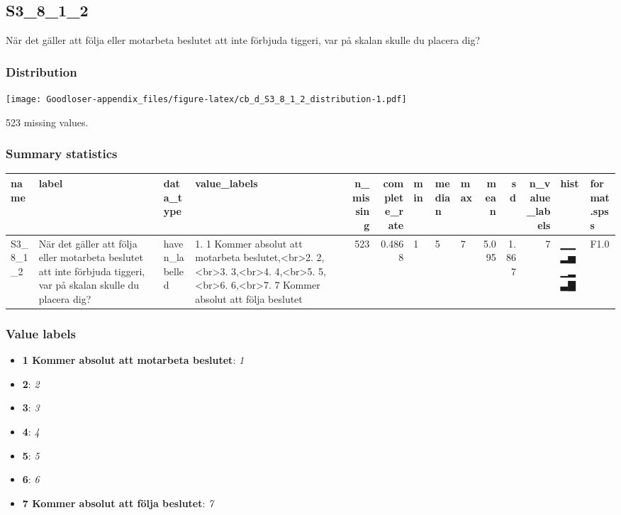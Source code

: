 \documentclass[
]{book}
\providecommand{\tightlist}{%
  \setlength{\itemsep}{0pt}\setlength{\parskip}{0pt}}
\begin{document}
\hypertarget{S3_8_1_2}{%
\subsection{S3\_8\_1\_2}\label{S3_8_1_2}}

När det gäller att följa eller motarbeta beslutet att inte förbjuda tiggeri, var på skalan skulle du placera dig?

\hypertarget{S3_8_1_2_distribution}{%
\subsubsection{Distribution}\label{S3_8_1_2_distribution}}

\texttt{[image: Goodloser-appendix\_files/figure-latex/cb\_d\_S3\_8\_1\_2\_distribution-1.pdf]}

523 missing values.

\hypertarget{S3_8_1_2_summary}{%
\subsubsection{Summary statistics}\label{S3_8_1_2_summary}}

\begin{tabular}{l|l|l|l|r|r|l|l|l|r|r|r|l|l}
\hline
name & label & data_type & value_labels & n_missing & complete_rate & min & median & max & mean & sd & n_value_labels & hist & format.spss\\
\hline
S3_8_1_2 & När det gäller att följa eller motarbeta beslutet att inte förbjuda tiggeri, var på skalan skulle du placera dig? & haven_labelled & 1. 1 Kommer absolut att motarbeta beslutet,<br>2. 2,<br>3. 3,<br>4. 4,<br>5. 5,<br>6. 6,<br>7. 7 Kommer absolut att följa beslutet & 523 & 0.4868 & 1 & 5 & 7 & 5.095 & 1.867 & 7 & ▁▁▂▅▁▂▃▇ & F1.0\\
\hline
\end{tabular}

\hypertarget{S3_8_1_2_labels}{%
\subsubsection{Value labels}\label{S3_8_1_2_labels}}

\begin{itemize}
\tightlist
\item
  \textbf{1 Kommer absolut att motarbeta beslutet}: \emph{1}
\item
  \textbf{2}: \emph{2}
\item
  \textbf{3}: \emph{3}
\item
  \textbf{4}: \emph{4}
\item
  \textbf{5}: \emph{5}
\item
  \textbf{6}: \emph{6}
\item
  \textbf{7 Kommer absolut att följa beslutet}: \emph{7}
\end{itemize}
\end{document}
